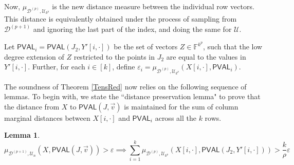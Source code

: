 \documentclass[10pt,a4paper]{article}
\newtheorem{lemma}[theorem]{Lemma}
\newcommand{\PVAL}{\mathsf{PVAL}}
\begin{document}
Now, $\mu_{\mathcal{D}^{(p)}, \mathcal{U}_{k^{p}}}$ is the new distance measure between the individual row vectors. This distance is equivalently obtained under the process of sampling from $\mathcal{D}^{(p+1)}$ and ignoring the last part of the index, and doing the same for $\mathcal{U}$.


Let $\PVAL_{i}=\PVAL(J_{2},Y'[i,\cdot])$ be the set of vectors $Z\in\mathbb{F}^{k^{p}}$, such that the low degree extension of $Z$ restricted to the points in $J_{2}$ are equal to the values in $Y'[i,\cdot]$. Further, for each $i \in [k]$, define $\varepsilon_{i}=\mu_{\mathcal{D}^{(p)}, \mathcal{U}_{k^{p}}}(X[i,\cdot],\PVAL_{i})$.

The soundness of Theorem \ref{TensRed} now relies on the following sequence of lemmas. To begin with, we state the ``distance preservation lemma" to prove that the distance from $X$ to $\PVAL(J,\Vec{v})$ is maintained for the sum of column marginal distances between $X[i,\cdot]$ and $\PVAL_i$ across all the $k$ rows.

\begin{lemma}
\label{epsilons}
\begin{equation*}
    \mu_{\mathcal{D}^{(p+1)}, \mathcal{U}_{n}}(X,\PVAL(J,\vec{v}))>\varepsilon\implies \sum_{i=1}^{k}\mu_{\mathcal{D}^{(p)}, \mathcal{U}_{k^{p}}}(X[i,\cdot],\PVAL(J_{2}, Y'[i,\cdot]))>\frac{k}{\rho}\varepsilon
\end{equation*}
\end{lemma}
\end{document}
